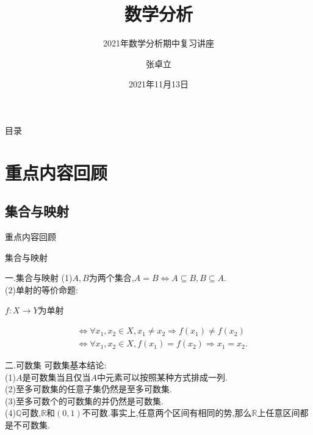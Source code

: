 \documentclass[UTF8]{ctexbeamer}
\title{数学分析}
\subtitle{2021年数学分析期中复习讲座}
\author{张卓立}
\institute{励志书院学业中心}
\date{2021年11月13日}
\begin{document}
    \begin{frame}    
        \titlepage
    \end{frame}
    \begin{frame}
        \large{目录}
        \tableofcontents
    \end{frame}
    \section{重点内容回顾}
    \subsection{集合与映射}
    \begin{frame}
        \begin{block}{\begin{center}重点内容回顾\end{center}}
            \begin{center}
                \Huge{集合与映射}
            \end{center}
        \end{block}
    \end{frame}
    \begin{frame}{一.集合与映射}
        (1)$A,B$为两个集合,$A=B\Longleftrightarrow A\subseteq B,B\subseteq A$.
        \\(2)单射的等价命题:
        \begin{center}
            $f:X\longrightarrow Y$为单射
        \end{center}
        $$\begin{aligned}
            &\Longleftrightarrow \forall x_1,x_2\in X,x_1\neq x_2\Longrightarrow f(x_1)\neq f(x_2)\\
            &\Longleftrightarrow \forall x_1,x_2\in X,f(x_1)=f(x_2)\Longrightarrow  x_1=x_2.
        \end{aligned}$$
    \end{frame}
    \begin{frame}{二.可数集}
        可数集基本结论:
        \\(1)$A$是可数集当且仅当$A$中元素可以按照某种方式排成一列.
        \\(2)至多可数集的任意子集仍然是至多可数集.
        \\(3)至多可数个的可数集的并仍然是可数集.
        \\(4)$\mathbb{Q}$可数,$\mathbb{R}$和$(0,1)$不可数.事实上,任意两个区间有相同的势,那么$\mathbb{R}$上任意区间都是不可数集.
    \end{frame}
\end{document}
